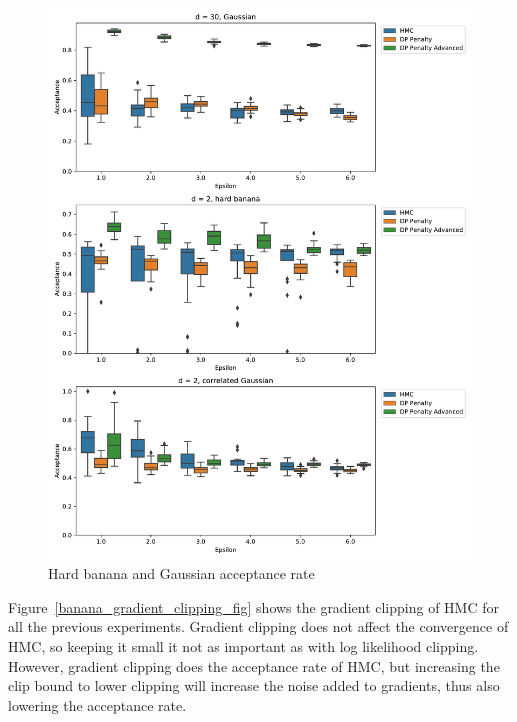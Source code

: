 ﻿\documentclass[a4paper]{article}
\begin{document}
\begin{figure}[h]
  \centering
  \includegraphics[width=\textwidth]{figures/banana_extra_acceptance}
  \caption{Hard banana and Gaussian acceptance rate }
  \label{banana_extra_acceptance_fig}
\end{figure}

Figure~\ref{banana_gradient_clipping_fig} shows the gradient clipping of
HMC for all the previous experiments. Gradient clipping does not affect
the convergence of HMC, so keeping it small it not as important as with
log likelihood clipping. However, gradient clipping does the acceptance rate
of HMC, but increasing the clip bound to lower clipping will increase the
noise added to gradients, thus also lowering the acceptance rate.
\end{document}
